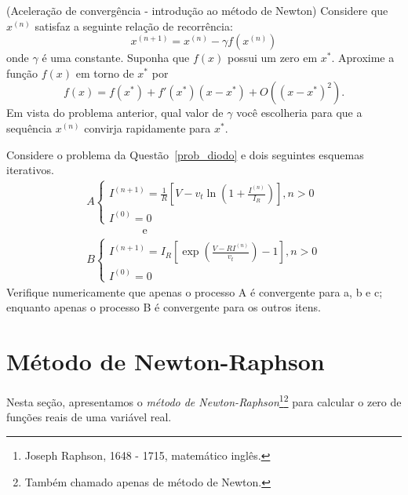 \begin{exer}(Aceleração de convergência - introdução ao método de Newton)\label{int_new2} Considere que $x^{(n)}$ satisfaz a seguinte relação de recorrência:
\begin{equation} x^{(n+1)}=x^{(n)} - \gamma f(x^{(n)}) \end{equation}
onde $\gamma$ é uma constante. Suponha que $f(x)$ possui um zero em $x^*$. Aproxime a função $f(x)$ em torno de $x^*$ por
\begin{equation} f(x)=f(x^*)+f'(x^*)(x-x^*)+O\left((x-x^*)^2\right). \end{equation}
Em vista do problema anterior, qual valor de $\gamma$ você escolheria para que a sequência $x^{(n)}$ convirja rapidamente para $x^*$.
\end{exer}

\begin{exer} Considere o problema da Questão~\ref{prob_diodo} e dois seguintes esquemas iterativos.
\begin{equation}\begin{array}{l}
A\left\{
\begin{array}{ll}
I^{(n+1)}=\frac{1}{R}\left[V-v_t\ln\left(1+\frac{I^{(n)}}{I_R}\right)\right],n>0\\
I^{(0)}=0
\end{array}\right.\\ \hspace{2cm} \text{ e }\\
B\left\{
\begin{array}{ll}
I^{(n+1)}=I_R\left[\exp\left(\frac{V-RI^{(n)}}{v_t}\right)-1\right],n>0\\
I^{(0)}=0
\end{array}\right.
\end{array}
\end{equation}
Verifique numericamente que apenas o processo A é convergente para a, b e c; enquanto apenas o processo B é convergente para os outros itens.
\end{exer}

\section{Método de Newton-Raphson}\label{sec:metodo_newton_1d}

Nesta seção, apresentamos o \emph{método de Newton-Raphson}\footnote{Joseph Raphson, 1648 - 1715, matemático inglês.}\footnote{Também chamado apenas de método de Newton.} para calcular o zero de funções reais de uma variável real.


